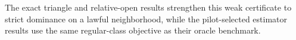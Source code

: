 The exact triangle and relative-open results strengthen this weak certificate to strict dominance on a lawful neighborhood, while the pilot-selected estimator results use the same regular-class objective as their oracle benchmark.